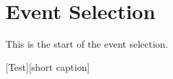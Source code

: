 \documentclass[class=NCU_thesis, crop=false]{standalone}
\begin{document}
\chapter{Event Selection}
This is the start of the event selection.

[Test][short caption]
\end{document}
